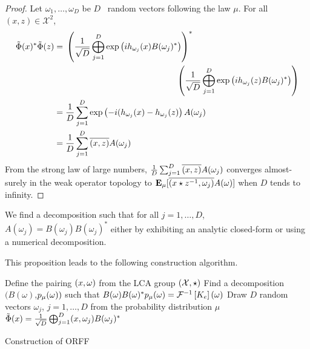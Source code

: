 \begin{proof}
Let $\omega_1, \ldots, \omega_D$ be $D$ \iid~random vectors following the law $\mu$. For all $(x,z) \in \mathcal{X}^2$, 
\begin{equation*}
\begin{aligned}
\tildePhi(x)^*\tildePhi(z)&= \!\begin{multlined}[t][.8\textwidth] \left(\frac{1}{\sqrt{D}}\Vect_{j=1}^D \exp\left(ih_{\omega_j}(x)B(\omega_j)^*\right)\right)^* {}\\ \left(\frac{1}{\sqrt{D}}\Vect_{j=1}^D \exp\left(ih_{\omega_j}(z)B(\omega_j)^*\right)\right) \end{multlined}\\
&= \frac{1}{D} \sum_{j=1}^D \exp\left(-i(h_{\omega_j}(x)-h_{\omega_j}(z)\right) A(\omega_j)\\
&= \frac{1}{D} \sum_{j=1}^D \conj{\pairing{x,z}}A(\omega_j)
\end{aligned}
\end{equation*}
From the strong law of large numbers, $ \frac{1}{D} \sum_{j=1}^D \overline{(x,z)}A(\omega_j)$ 
converges almost-surely in the weak operator topology to ${\text{\textbf{E}}}_{\mu}[\overline{(x\star z^{-1},\omega_j)}A(\omega) ]$ when $D$ tends to infinity.
\end{proof}
\begin{remark}
We find a decomposition such that for all $j=1, \ldots, D$, $A(\omega_j)=B(\omega_j)B(\omega_j)^*$ either by exhibiting an analytic closed-form or using a numerical decomposition. 
\end{remark}
This proposition leads to the following construction algorithm.
\begin{center}
\begin{algorithm2e}[H]
	\SetAlgoLined
    \BlankLine
	Define the pairing $(x, \omega)$ from the \acs{LCA} group $(\mathcal{X}, \star)$\;
	Find a decomposition $(B(\omega)$,$p_{\mu}(\omega))$ such that $B(\omega)B(\omega)^*p_{\mu}(\omega)=\mathcal{F}^{-1}\left[K_e\right](\omega)$\;
	Draw $D$ random vectors $\omega_j$, $j=1, \hdots, D$ from the probability distribution $\mu$\;
   \Return $\tilde{\Phi}(x)=\frac{1}{\sqrt{D}}\operatorname*{\bigoplus}_{j=1}^D(x, \omega_j)B(\omega_j)^*$\;
   \caption{Construction of ORFF}
   \label{al:ORFF_construction}
\end{algorithm2e}
\end{center}

